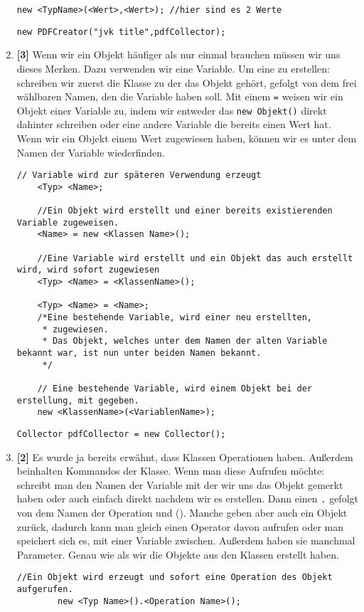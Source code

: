 \begin{enumerate}
\begin{lstlisting}[title=\textbf{Konstruktor Syntax},firstnumber=5]
    new <TypName>(<Wert>,<Wert>); //hier sind es 2 Werte
    \end{lstlisting}
          \begin{lstlisting}[title=\textbf{Beispiel (1/3) Konstruktor},firstnumber=2,frame=lr]
        new PDFCreator("jvk title",pdfCollector);
    \end{lstlisting}
    \item \textbf{[3]} Wenn wir ein Objekt häufiger als nur einmal brauchen müssen wir uns dieses Merken. Dazu verwenden wir eine Variable. Um eine zu erstellen: schreiben wir zuerst die Klasse zu der das Objekt gehört, gefolgt von dem frei wählbaren Namen, den die Variable haben soll. Mit einem \lstinline{=} weisen wir ein Objekt einer Variable zu, indem wir entweder das \lstinline{new Objekt()} direkt dahinter schreiben oder eine andere
          Variable die bereits einen Wert hat.
          Wenn wir ein Objekt einem Wert zugewiesen haben, können wir es unter dem Namen der Variable wiederfinden.
          \begin{lstlisting}[title=\textbf{Variablen Syntax}]
    // Variable wird zur späteren Verwendung erzeugt
    <Typ> <Name>; 

    //Ein Objekt wird erstellt und einer bereits existierenden Variable zugeweisen.
    <Name> = new <Klassen Name>(); 

    //Eine Variable wird erstellt und ein Objekt das auch erstellt wird, wird sofort zugewiesen
    <Typ> <Name> = <KlassenName>(); 

    <Typ> <Name> = <Name>; 
    /*Eine bestehende Variable, wird einer neu erstellten,
     * zugewiesen.
     * Das Objekt, welches unter dem Namen der alten Variable bekannt war, ist nun unter beiden Namen bekannt.
     */

    // Eine bestehende Variable, wird einem Objekt bei der erstellung, mit gegeben.
    new <KlassenName>(<VariablenName>); 
          \end{lstlisting}
          \begin{lstlisting}[title=\textbf{Beispiel (2/3) Variablen},firstnumber=1,frame=ltr]
            Collector pdfCollector = new Collector();
        \end{lstlisting}
    \item \textbf{[2]} Es wurde ja bereits erwähnt, dass Klassen Operationen haben. Außerdem beinhalten  Kommandos der Klasse. Wenn man diese Aufrufen möchte: schreibt man den Namen der Variable mit der wir uns das Objekt gemerkt haben oder auch einfach direkt nachdem wir es erstellen. Dann einen \lstinline{.} gefolgt von dem Namen der Operation und (). Manche geben aber auch ein Objekt zurück, dadurch kann man gleich einen Operator davon aufrufen oder man speichert sich es, mit einer Variable zwischen. Außerdem haben sie manchmal Parameter. Genau wie als wir die Objekte aus den Klassen erstellt haben.
          \begin{lstlisting}[title=\textbf{Kommando Syntax},firstnumber=4]
        //Ein Objekt wird erzeugt und sofort eine Operation des Objekt aufgerufen.
        new <Typ Name>().<Operation Name>(); 


\end{lstlisting}
\end{enumerate}
